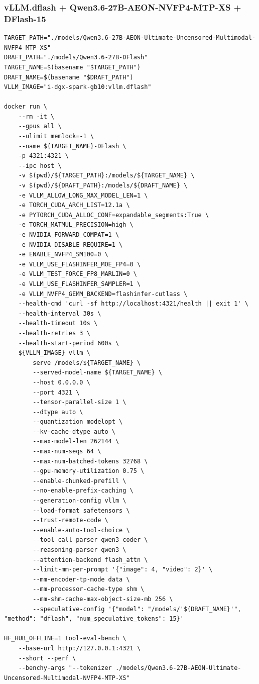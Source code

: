 \documentclass{article}
\begin{document}
\subsubsection{vLLM.dflash + Qwen3.6-27B-AEON-NVFP4-MTP-XS + DFlash-15}
\begin{lstlisting}
TARGET_PATH="./models/Qwen3.6-27B-AEON-Ultimate-Uncensored-Multimodal-NVFP4-MTP-XS"
DRAFT_PATH="./models/Qwen3.6-27B-DFlash"
TARGET_NAME=$(basename "$TARGET_PATH")
DRAFT_NAME=$(basename "$DRAFT_PATH")
VLLM_IMAGE="i-dgx-spark-gb10:vllm.dflash"

docker run \
    --rm -it \
    --gpus all \
    --ulimit memlock=-1 \
    --name ${TARGET_NAME}-DFlash \
    -p 4321:4321 \
    --ipc host \
    -v $(pwd)/${TARGET_PATH}:/models/${TARGET_NAME} \
    -v $(pwd)/${DRAFT_PATH}:/models/${DRAFT_NAME} \
    -e VLLM_ALLOW_LONG_MAX_MODEL_LEN=1 \
    -e TORCH_CUDA_ARCH_LIST=12.1a \
    -e PYTORCH_CUDA_ALLOC_CONF=expandable_segments:True \
    -e TORCH_MATMUL_PRECISION=high \
    -e NVIDIA_FORWARD_COMPAT=1 \
    -e NVIDIA_DISABLE_REQUIRE=1 \
    -e ENABLE_NVFP4_SM100=0 \
    -e VLLM_USE_FLASHINFER_MOE_FP4=0 \
    -e VLLM_TEST_FORCE_FP8_MARLIN=0 \
    -e VLLM_USE_FLASHINFER_SAMPLER=1 \
    -e VLLM_NVFP4_GEMM_BACKEND=flashinfer-cutlass \
    --health-cmd 'curl -sf http://localhost:4321/health || exit 1' \
    --health-interval 30s \
    --health-timeout 10s \
    --health-retries 3 \
    --health-start-period 600s \
    ${VLLM_IMAGE} vllm \
        serve /models/${TARGET_NAME} \
        --served-model-name ${TARGET_NAME} \
        --host 0.0.0.0 \
        --port 4321 \
        --tensor-parallel-size 1 \
        --dtype auto \
        --quantization modelopt \
        --kv-cache-dtype auto \
        --max-model-len 262144 \
        --max-num-seqs 64 \
        --max-num-batched-tokens 32768 \
        --gpu-memory-utilization 0.75 \
        --enable-chunked-prefill \
        --no-enable-prefix-caching \
        --generation-config vllm \
        --load-format safetensors \
        --trust-remote-code \
        --enable-auto-tool-choice \
        --tool-call-parser qwen3_coder \
        --reasoning-parser qwen3 \
        --attention-backend flash_attn \
        --limit-mm-per-prompt '{"image": 4, "video": 2}' \
        --mm-encoder-tp-mode data \
        --mm-processor-cache-type shm \
        --mm-shm-cache-max-object-size-mb 256 \
        --speculative-config '{"model": "/models/'${DRAFT_NAME}'", "method": "dflash", "num_speculative_tokens": 15}'

HF_HUB_OFFLINE=1 tool-eval-bench \
    --base-url http://127.0.0.1:4321 \
    --short --perf \
    --benchy-args "--tokenizer ./models/Qwen3.6-27B-AEON-Ultimate-Uncensored-Multimodal-NVFP4-MTP-XS"
\end{lstlisting}
\end{document}
